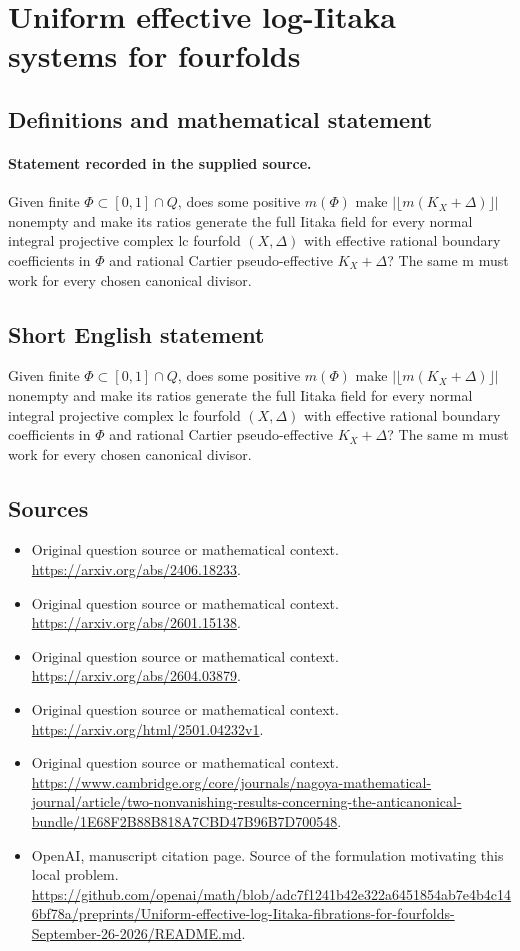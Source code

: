 \documentclass[11pt]{article}
\begin{document}
\section*{Uniform effective log-Iitaka systems for fourfolds}\label{30007073}
\subsection{Definitions and mathematical statement}
\paragraph{Statement recorded in the supplied source.}
Given finite $\Phi \subset [0,1]\cap Q$, does some positive $m(\Phi )$ make $|\lfloor m(K_X+\Delta )\rfloor |$ nonempty and make its ratios generate the full Iitaka field for every normal integral projective complex lc fourfold $(X,\Delta )$ with effective rational boundary coefficients in $\Phi $ and rational Cartier pseudo-effective $K_X+\Delta $? The same m must work for every chosen canonical divisor.
\subsection{Short English statement}
Given finite $\Phi \subset [0,1]\cap Q$, does some positive $m(\Phi )$ make $|\lfloor m(K_X+\Delta )\rfloor |$ nonempty and make its ratios generate the full Iitaka field for every normal integral projective complex lc fourfold $(X,\Delta )$ with effective rational boundary coefficients in $\Phi $ and rational Cartier pseudo-effective $K_X+\Delta $? The same m must work for every chosen canonical divisor.
\subsection{Sources}
\begin{itemize}
\item[S1] Original question source or mathematical context.
\url{https://arxiv.org/abs/2406.18233}.
\item[S2] Original question source or mathematical context.
\url{https://arxiv.org/abs/2601.15138}.
\item[S3] Original question source or mathematical context.
\url{https://arxiv.org/abs/2604.03879}.
\item[S4] Original question source or mathematical context.
\url{https://arxiv.org/html/2501.04232v1}.
\item[S5] Original question source or mathematical context.
\url{https://www.cambridge.org/core/journals/nagoya-mathematical-journal/article/two-nonvanishing-results-concerning-the-anticanonical-bundle/1E68F2B88B818A7CBD47B96B7D700548}.
\item[S6] OpenAI, manuscript citation page. Source of the formulation motivating this local problem.
\url{https://github.com/openai/math/blob/adc7f1241b42e322a6451854ab7e4b4c146bf78a/preprints/Uniform-effective-log-Iitaka-fibrations-for-fourfolds-September-26-2026/README.md}.
\end{itemize}
\end{document}
